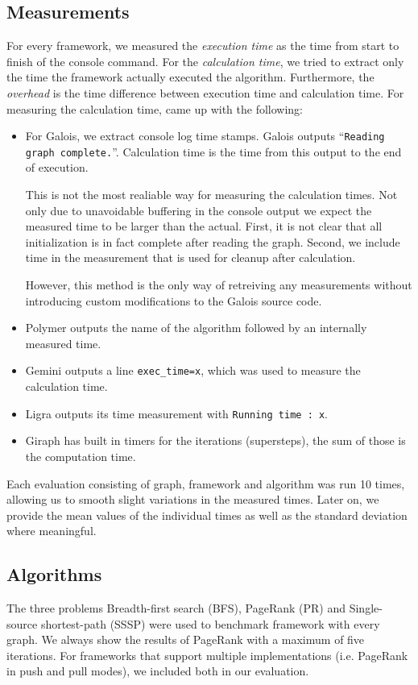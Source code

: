 \subsection{Measurements}
For every framework, we measured the \emph{execution time} as the time from start to finish of the console command.
For the \emph{calculation time}, we tried to extract only the time the framework actually executed the algorithm. 
Furthermore, the \emph{overhead} is the time difference between execution time and calculation time.
For measuring the calculation time, came up with the following:
\begin{itemize}
	\item For Galois, we extract console log time stamps. Galois outputs \enquote{\texttt{Reading graph complete.}}. Calculation time is the time from this output to the end of execution.

	This is not the most realiable way for measuring the calculation times. 
	Not only due to unavoidable buffering in the console output we expect the measured time to be larger than the actual.
	First, it is not clear that all initialization is in fact complete after reading the graph. Second, we include time in the measurement that is used for cleanup after calculation.

	However, this method is the only way of retreiving any measurements without introducing custom modifications to the Galois source code.

	\item Polymer outputs the name of the algorithm followed by an internally measured time.

	\item Gemini outputs a line \texttt{exec\_time=x}, which was used to measure the calculation time.

	\item Ligra outputs its time measurement with \texttt{Running time : x}.

	\item Giraph has built in timers for the iterations (supersteps), the sum of those is the computation time.
\end{itemize}
Each evaluation consisting of graph, framework and algorithm was run 10 times, allowing us to smooth slight variations in the measured times.
Later on, we provide the mean values of the individual times as well as the standard deviation where meaningful.



\subsection{Algorithms}
The three problems Breadth-first search (BFS), PageRank (PR) and Single-source shortest-path (SSSP) were used to benchmark framework with every graph.
We always show the results of PageRank with a maximum of five iterations.
For frameworks that support multiple implementations (i.e. PageRank in push and pull modes), we included both in our evaluation. 

